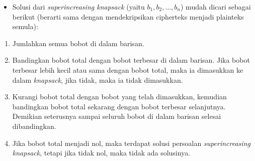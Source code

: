\documentclass{article}
\begin{document}

\begin{itemize}
    \item Solusi dari \textit{superincreasing knapsack} (yaitu $b_1, b_2, ..., b_n$) mudah dicari sebagai berikut (berarti sama dengan mendekripsikan cipherteks menjadi plainteks semula):
\end{itemize}

\begin{enumerate}
    \item Jumlahkan semua bobot di dalam barisan.
    \item Bandingkan bobot total dengan bobot terbesar di dalam barisan. Jika bobot terbesar lebih kecil atau sama dengan bobot total, maka ia dimasukkan ke dalam \textit{knapsack}, jika tidak, maka ia tidak dimasukkan.
    \item Kurangi bobot total dengan bobot yang telah dimasukkan, kemudian bandingkan bobot total sekarang dengan bobot terbesar selanjutnya. Demikian seterusnya sampai seluruh bobot di dalam barisan selesai dibandingkan.
    \item Jika bobot total menjadi nol, maka terdapat solusi persoalan \textit{superincreasing knapsack}, tetapi jika tidak nol, maka tidak ada solusinya.
\end{enumerate}
\end{document}

